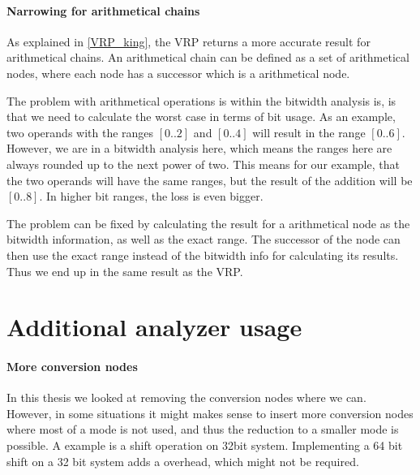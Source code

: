 \paragraph{Narrowing for arithmetical chains}
As explained in \ref{VRP_king}, the VRP returns a more accurate result for arithmetical chains. An arithmetical chain can be defined as a set of arithmetical nodes, where each node has a successor which is a arithmetical node.

The problem with arithmetical operations is within the bitwidth analysis is, is that we need to calculate the worst case in terms of bit usage. As an example, two operands with the ranges $[0..2]$ and $[0..4]$ will result in the range $[0..6]$. However, we are in a bitwidth analysis here, which means the ranges here are always rounded up to the next power of two. This means for our example, that the two operands will have the same ranges, but the result of the addition will be $[0..8]$. In higher bit ranges, the loss is even bigger.

The problem can be fixed by calculating the result for a arithmetical node as the bitwidth information, as well as the exact range. The successor of the node can then use the exact range instead of the bitwidth info for calculating its results. Thus we end up in the same result as the VRP.

\section{Additional analyzer usage}
\paragraph{More conversion nodes}
In this thesis we looked at removing the conversion nodes where we can. However, in some situations it might makes sense to insert more conversion nodes where most of a mode is not used, and thus the reduction to a smaller mode is possible. A example is a shift operation on 32bit system. Implementing a 64 bit shift on a 32 bit system adds a overhead, which might not be required.